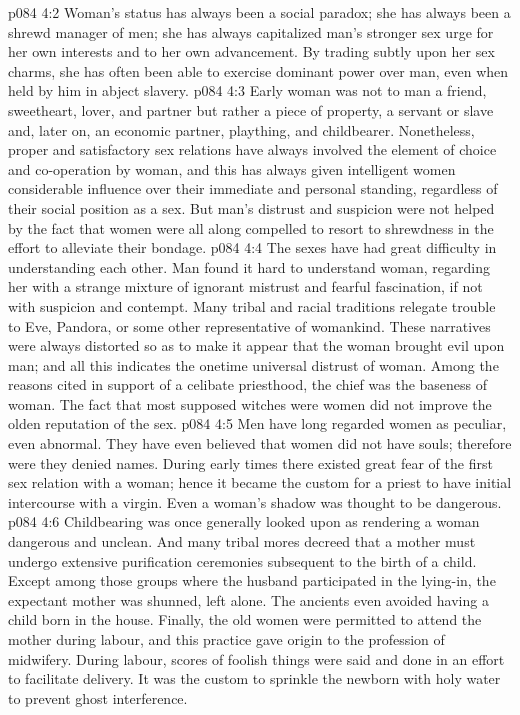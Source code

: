\vs p084 4:2 \pc Woman’s status has always been a social paradox; she has always been a shrewd manager of men; she has always capitalized man’s stronger sex urge for her own interests and to her own advancement. By trading subtly upon her sex charms, she has often been able to exercise dominant power over man, even when held by him in abject slavery.
\vs p084 4:3 Early woman was not to man a friend, sweetheart, lover, and partner but rather a piece of property, a servant or slave and, later on, an economic partner, plaything, and childbearer. Nonetheless, proper and satisfactory sex relations have always involved the element of choice and co\hyp{}operation by woman, and this has always given intelligent women considerable influence over their immediate and personal standing, regardless of their social position as a sex. But man’s distrust and suspicion were not helped by the fact that women were all along compelled to resort to shrewdness in the effort to alleviate their bondage.
\vs p084 4:4 \pc The sexes have had great difficulty in understanding each other. Man found it hard to understand woman, regarding her with a strange mixture of ignorant mistrust and fearful fascination, if not with suspicion and contempt. Many tribal and racial traditions relegate trouble to Eve, Pandora, or some other representative of womankind. These narratives were always distorted so as to make it appear that the woman brought evil upon man; and all this indicates the onetime universal distrust of woman. Among the reasons cited in support of a celibate priesthood, the chief was the baseness of woman. The fact that most supposed witches were women did not improve the olden reputation of the sex.
\vs p084 4:5 Men have long regarded women as peculiar, even abnormal. They have even believed that women did not have souls; therefore were they denied names. During early times there existed great fear of the first sex relation with a woman; hence it became the custom for a priest to have initial intercourse with a virgin. Even a woman’s shadow was thought to be dangerous.
\vs p084 4:6 Childbearing was once generally looked upon as rendering a woman dangerous and unclean. And many tribal mores decreed that a mother must undergo extensive purification ceremonies subsequent to the birth of a child. Except among those groups where the husband participated in the lying\hyp{}in, the expectant mother was shunned, left alone. The ancients even avoided having a child born in the house. Finally, the old women were permitted to attend the mother during labour, and this practice gave origin to the profession of midwifery. During labour, scores of foolish things were said and done in an effort to facilitate delivery. It was the custom to sprinkle the newborn with holy water to prevent ghost interference.
